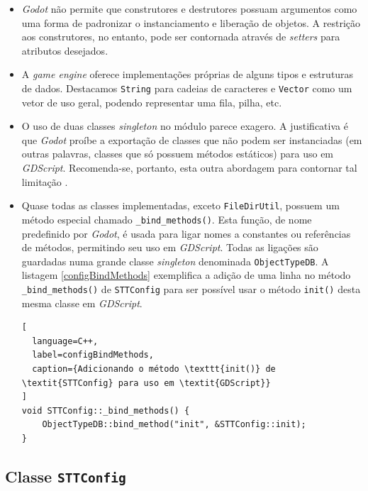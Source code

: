 \begin{itemize}
\item \textit{Godot} não permite que construtores e destrutores possuam argumentos como uma forma de padronizar o instanciamento e liberação de objetos. A restrição aos construtores, no entanto, pode ser contornada através de \textit{setters} para atributos desejados.

\item A \textit{game engine} oferece implementações próprias de alguns tipos e estruturas de dados. Destacamos \texttt{String} para cadeias de caracteres e \texttt{Vector} como um vetor de uso geral, podendo representar uma fila, pilha, etc.

\item O uso de duas classes \textit{singleton} no módulo parece exagero. A justificativa é que \textit{Godot} proíbe a exportação de classes que não podem ser instanciadas (em outras palavras, classes que só possuem métodos estáticos) para uso em \textit{GDScript}. Recomenda-se, portanto, esta outra abordagem para contornar tal limitação \citep{godotStaticClasses}.

\item Quase todas as classes implementadas, exceto \texttt{FileDirUtil}, possuem um método especial chamado \texttt{\_bind\_methods()}. Esta função, de nome predefinido por \textit{Godot}, é usada para ligar nomes a constantes ou referências de métodos, permitindo seu uso em \textit{GDScript}. Todas as ligações são guardadas numa grande classe \textit{singleton} denominada \texttt{ObjectTypeDB}. A listagem \ref{configBindMethods} exemplifica a adição de uma linha no método \texttt{\_bind\_methods()} de \texttt{STTConfig} para ser possível usar o método \texttt{init()} desta mesma classe em \textit{GDScript}.

\begin{lstlisting}[
  language=C++,
  label=configBindMethods,
  caption={Adicionando o método \texttt{init()} de \textit{STTConfig} para uso em \textit{GDScript}}
]
void STTConfig::_bind_methods() {
    ObjectTypeDB::bind_method("init", &STTConfig::init);
}
\end{lstlisting}
\end{itemize}


\subsection{Classe \texttt{STTConfig}}
\label{stt-config}

